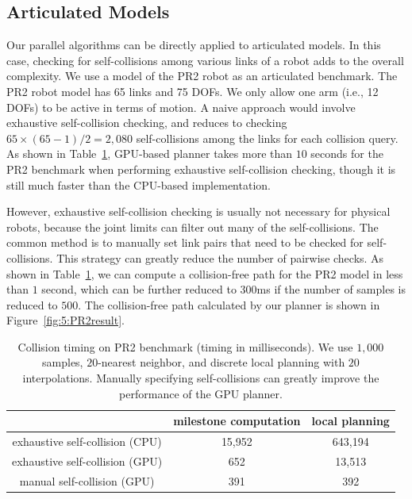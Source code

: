 \subsection{Articulated Models}
Our parallel algorithms can be directly applied to articulated models. In this case, checking for self-collisions among
various links of a robot adds to the overall complexity. We use a model of the PR2 robot as an articulated
benchmark. The PR2 robot model has 65 links and 75 DOFs. We only allow one arm (i.e., 12 DOFs) to be active in terms
of motion. A naive approach would involve exhaustive self-collision checking, and reduces to checking
$65 \times (65-1)/2 = 2,080$ self-collisions among the links for each collision query.
As shown in Table~\ref{tab:5:selfcollision}, GPU-based planner takes more than $10$ seconds for the PR2 benchmark when
performing exhaustive self-collision checking, though it is still much faster than the CPU-based implementation.

However, exhaustive self-collision checking is usually not necessary for  physical robots, because the joint limits can
filter out many of the self-collisions. The common method is to manually set link pairs that need to be checked
for self-collisions. This strategy can greatly reduce the number of pairwise checks. As shown in Table~\ref{tab:5:selfcollision}, we can compute a collision-free path for the PR2 model in less than $1$ second, which can be further reduced to $300$ms if
the number of samples is reduced to $500$. The collision-free path calculated by our planner is shown in Figure~\ref{fig:5:PR2result}.


\begin{table}[!htb]
\begin{center}
\begin{tabular}{|c|c|c|} \hline
                                & milestone computation & local planning \\ \hline
exhaustive self-collision (CPU) & 15,952 & 643,194 \\ \hline
exhaustive self-collision (GPU) & 652 & 13,513 \\ \hline
manual self-collision (GPU) & 391 & 392 \\ \hline
\end{tabular}
\end{center}
\caption[Comparison of the collision timing on PR2 benchmark when using CPU-based and GPU-based collision checking algorithms]{Collision timing on PR2 benchmark (timing in milliseconds). We use $1,000$ samples, $20$-nearest neighbor, and discrete local planning with $20$ interpolations. Manually specifying self-collisions can greatly improve the performance of the GPU planner. }\label{tab:5:selfcollision}
\end{table}


